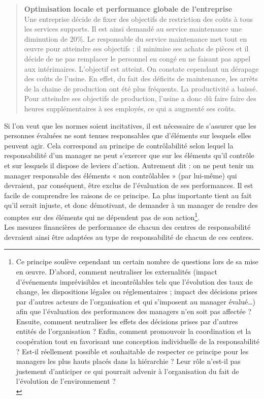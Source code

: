 \documentclass{tufte-handout}
\begin{document}
\begin{verse}
\textbf{Optimisation locale et performance globale de l’entreprise}\\
Une entreprise décide de fixer des objectifs de restriction des coûts à tous les services supports. Il est ainsi demandé au service maintenance une diminution de 20\%. Le responsable du service maintenance met tout en œuvre pour atteindre ses objectifs : il minimise ses achats de pièces et il décide de ne pas remplacer le personnel en congé en ne faisant pas appel aux intérimaires. L’objectif est atteint. On constate cependant un dérapage des coûts de l’usine. En effet, du fait des déficits de maintenance, les arrêts de la chaine de production ont été plus fréquents. La productivité a baissé. Pour atteindre ses objectifs de production, l’usine a donc dû faire faire des heures supplémentaires à ses employés, ce qui a augmenté ses coûts.\\
\end{verse}

Si l’on veut que les normes soient incitatives, il est nécessaire de s’assurer que les personnes évaluées ne sont tenues responsables que d’éléments sur lesquels elles peuvent agir. Cela correspond au principe de contrôlabilité selon lequel la responsabilité d’un manager ne peut s’exercer que sur les éléments qu’il contrôle et sur lesquels il dispose de leviers d’action. Autrement dit : on ne peut tenir un manager responsable des éléments « non contrôlables » (par lui-même) qui devraient, par conséquent, être exclus de l’évaluation de ses performances. Il est facile de comprendre les raisons de ce principe. La plus importante tient au fait qu’il serait injuste, et donc démotivant, de demander à un manager de rendre des comptes sur des éléments qui ne dépendent pas de son action\footnote{Ce principe soulève cependant un certain nombre de questions lors de sa mise en œuvre. D'abord, comment neutraliser les externalités (impact d’événements imprévisibles et incontrôlables tels que l’évolution des taux de change, les dispositions légales ou réglementaires ; impact des décisions prises par d’autres acteurs de l’organisation et qui s’imposent au manager évalué…) afin que l’évaluation des performances des managers n’en soit pas affectée ? Ensuite, comment neutraliser les effets des décisions prises par d’autres entités de l’organisation ? Enfin, comment promouvoir la coordination et la coopération tout en favorisant une conception individuelle de la responsabilité ? Est-il réellement possible et souhaitable de respecter ce principe pour les managers les plus hauts placés dans la hiérarchie ? Leur rôle n’est-il pas justement d’anticiper ce qui pourrait advenir à l’organisation du fait de l’évolution de l’environnement ?\\}.\\
Les mesures financières de performance de chacun des centres de responsabilité devraient ainsi être adaptées au type de responsabilité de chacun de ces centres.\\
\end{document}
